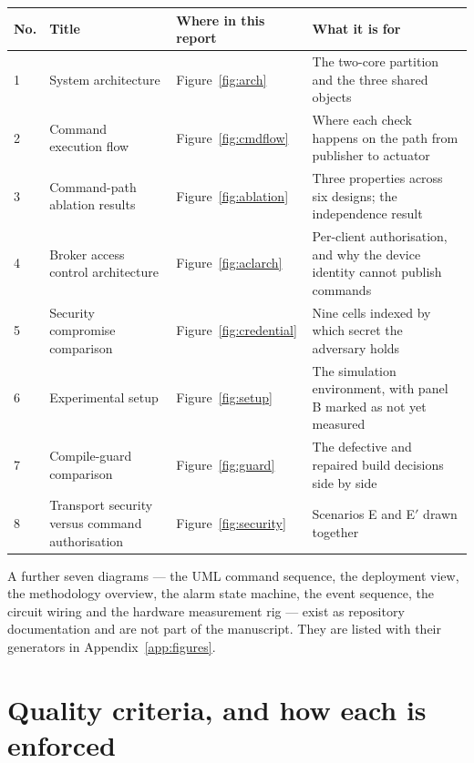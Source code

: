 \begin{longtable}{@{}p{}p{}p{}p{}@{}}
\toprule
\textbf{No.} & \textbf{Title} & \textbf{Where in this report} & \textbf{What it is for} \\
\midrule
\endhead
1 & System architecture & Figure~\ref{fig:arch} & The two-core partition and the three shared
objects \\
2 & Command execution flow & Figure~\ref{fig:cmdflow} & Where each check happens on the path from
publisher to actuator \\
3 & Command-path ablation results & Figure~\ref{fig:ablation} & Three properties across six
designs; the independence result \\
4 & Broker access control architecture & Figure~\ref{fig:aclarch} & Per-client authorisation, and
why the device identity cannot publish commands \\
5 & Security compromise comparison & Figure~\ref{fig:credential} & Nine cells indexed by which
secret the adversary holds \\
6 & Experimental setup & Figure~\ref{fig:setup} & The simulation environment, with panel B marked
as not yet measured \\
7 & Compile-guard comparison & Figure~\ref{fig:guard} & The defective and repaired build
decisions side by side \\
8 & Transport security versus command authorisation & Figure~\ref{fig:security} & Scenarios E and
E$'$ drawn together \\
\bottomrule
\end{longtable}

A further seven diagrams --- the UML command sequence, the deployment view, the methodology
overview, the alarm state machine, the event sequence, the circuit wiring and the hardware
measurement rig --- exist as repository documentation and are not part of the manuscript. They are
listed with their generators in Appendix~\ref{app:figures}.

\section{Quality criteria, and how each is enforced}

